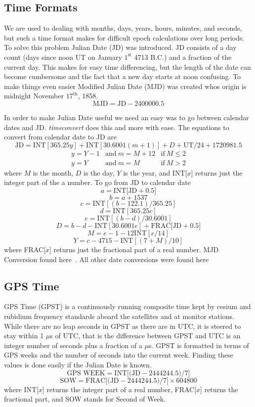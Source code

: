 \subsection{Time Formats}
We are used to dealing with months, days, years, hours, minutes, and seconds, but such a time format makes for difficult epoch calculations over long periods. To solve this problem Julian Date (JD) was introduced. JD consists of a day count (days since noon UT on January $1^{\mbox{st}}$ 4713 B.C.) and a fraction of the current day. This makes for easy time differencing, but the length of the date can become cumbersome and the fact that a new day starts at noon confusing. To make things even easier Modified Julian Date (MJD) was created whos origin is midnight November $17^{\mbox{th}}$, 1858.
\[ \mbox{MJD}=\mbox{JD}-2400000.5\]

In order to make Julian Date useful we need an easy was to go between calendar dates and JD. \emph{timeconvert} does this and more with ease. The equations to convert from calendar date to JD are
\[ \mbox{JD}=\mbox{INT}[365.25y]+\mbox{INT}[30.6001(m+1)]+D+\mbox{UT}/24+1720981.5\]
\[ \begin{array}{lll}
y=Y-1 & \mbox{and}~m=M+12 & \mbox{if}~M \leq2 \\
y=Y & \mbox{and}~m=M & \mbox{if}~M > 2
\end{array} \]
where $M$ is the month, $D$ is the day, $Y$ is the year, and INT[$x$] returns just the integer part of the a number. To go from JD to calendar date
\[ a=\mbox{INT[JD}+0.5] \]
\[ b=a+1537 \]
\[ c=\mbox{INT}[(b-122.1)/365.25] \]
\[ d=\mbox{INT}[365.25c] \]
\[ e=\mbox{INT}[(b-d)/30.6001] \]
\[ D=b-d-\mbox{INT}[30.6001e]+\mbox{FRAC[JD}+0.5] \]
\[ M=e-1-12\mbox{INT}[e/14] \]
\[ Y=c-4715-\mbox{INT}[(7+M)/10] \]
where FRAC[$x$] returns just the fractional part of a real number. MJD Conversion found here~\cite[p. 88]{me:gsmp}. All other date conversions were found here~\cite[pp. 36-37]{hlc:gtp}
\subsection{GPS Time}
GPS Time (GPST) is a continuously running composite time kept by cesium and rubidium frequency standards aboard the satellites and at monitor stations. While there are no leap seconds in GPST as there are in UTC, it is steered to stay within 1 $\mu$s of UTC, that is the difference between GPST and UTC is an integer number of seconds plus a fraction of a $\mu$s. GPST is formatted in terms of GPS weeks and the number of seconds into the current week. Finding these values is done easily if the Julian Date is known.
\[ \mbox{GPS WEEK}=\mbox{INT[(JD}-2444244.5)/7] \]
\[ \mbox{SOW}=\mbox{FRAC[(JD}-2444244.5)/7]\times 604800 \]
where INT[$x$] returns the integer part of a real number, FRAC[$x$] returns the fractional part, and SOW stands for Second of Week.


